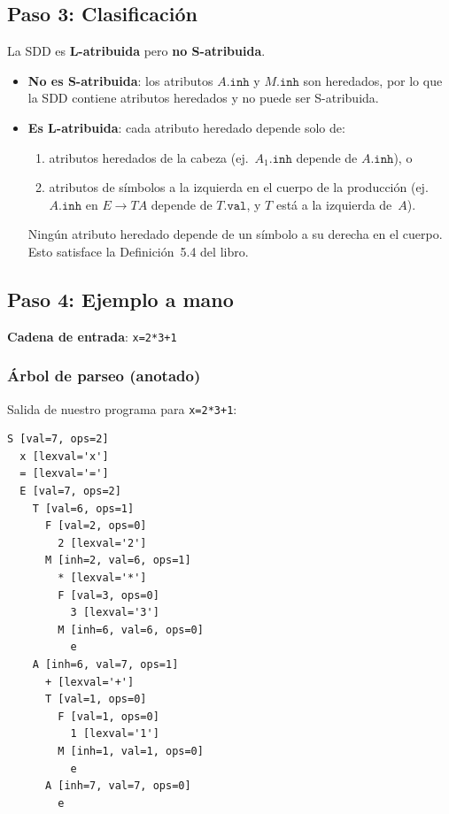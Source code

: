 \documentclass[11pt,a4paper]{article}
\begin{document}
\subsection{Paso 3: Clasificaci\'on}

La SDD es \textbf{L-atribuida} pero \textbf{no S-atribuida}.

\begin{itemize}
  \item \textbf{No es S-atribuida}: los atributos $A.\texttt{inh}$ y $M.\texttt{inh}$ son heredados, por lo que la SDD contiene atributos heredados y no puede ser S-atribuida.
  \item \textbf{Es L-atribuida}: cada atributo heredado depende solo de:
    \begin{enumerate}
      \item atributos heredados de la cabeza (ej.\ $A_1.\texttt{inh}$ depende de $A.\texttt{inh}$), o
      \item atributos de s\'imbolos a la izquierda en el cuerpo de la producci\'on (ej.\ $A.\texttt{inh}$ en $E \to TA$ depende de $T.\texttt{val}$, y $T$ est\'a a la izquierda de~$A$).
    \end{enumerate}
    Ning\'un atributo heredado depende de un s\'imbolo a su derecha en el cuerpo. Esto satisface la Definici\'on~5.4 del libro.
\end{itemize}

\subsection{Paso 4: Ejemplo a mano}

\textbf{Cadena de entrada}: \texttt{x=2*3+1}

\subsubsection*{\'Arbol de parseo (anotado)}

Salida de nuestro programa para \texttt{x=2*3+1}:

\begin{lstlisting}
S [val=7, ops=2]
  x [lexval='x']
  = [lexval='=']
  E [val=7, ops=2]
    T [val=6, ops=1]
      F [val=2, ops=0]
        2 [lexval='2']
      M [inh=2, val=6, ops=1]
        * [lexval='*']
        F [val=3, ops=0]
          3 [lexval='3']
        M [inh=6, val=6, ops=0]
          e
    A [inh=6, val=7, ops=1]
      + [lexval='+']
      T [val=1, ops=0]
        F [val=1, ops=0]
          1 [lexval='1']
        M [inh=1, val=1, ops=0]
          e
      A [inh=7, val=7, ops=0]
        e
\end{lstlisting}
\end{document}
